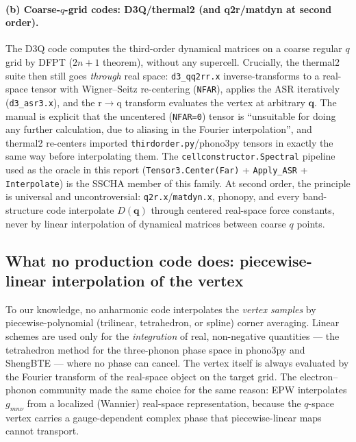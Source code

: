 \documentclass[11pt,a4paper]{article}
\newcommand{\qv}{\mathbf{q}}
\begin{document}
\paragraph{(b) Coarse-$q$-grid codes: D3Q/thermal2 (and
q2r/matdyn at second order).}  The D3Q code \cite{d3q} computes the
third-order dynamical matrices on a coarse regular $q$ grid by DFPT
($2n{+}1$ theorem), without any supercell.  Crucially, the thermal2 suite
\cite{thermal2} then still goes \emph{through} real space:
\texttt{d3\_qq2rr.x} inverse-transforms to a real-space tensor with
Wigner--Seitz re-centering (\texttt{NFAR}), applies the ASR iteratively
(\texttt{d3\_asr3.x}), and the r$\to$q transform evaluates the vertex at
arbitrary $\qv$.  The manual is explicit that the uncentered
(\texttt{NFAR=0}) tensor is ``unsuitable for doing any further
calculation, due to aliasing in the Fourier interpolation'', and thermal2
re-centers imported \texttt{thirdorder.py}/phono3py tensors in exactly
the same way before interpolating them.  The
\texttt{cellconstructor.Spectral} pipeline used as the oracle in this
report (\texttt{Tensor3.Center(Far)} + \texttt{Apply\_ASR} +
\texttt{Interpolate}) is the SSCHA member of this family.  At second
order, the principle is universal and uncontroversial:
\texttt{q2r.x}/\texttt{matdyn.x}, phonopy, and every band-structure code
interpolate $D(\qv)$ through centered real-space force constants, never
by linear interpolation of dynamical matrices between coarse $q$ points.

\subsection{What no production code does: piecewise-linear interpolation
of the vertex}
\label{sec:codes-trilinear}

To our knowledge, no anharmonic code interpolates the \emph{vertex
samples} by piecewise-polynomial (trilinear, tetrahedron, or spline)
corner averaging.  Linear schemes are used only for the
\emph{integration} of real, non-negative quantities --- the tetrahedron
method for the three-phonon phase space in phono3py and ShengBTE
\cite{phono3py,shengbte} --- where no phase can cancel.  The vertex
itself is always evaluated by the Fourier transform of the real-space
object on the target grid.  The electron--phonon community made the same
choice for the same reason: EPW \cite{epw} interpolates $g_{mn\nu}$ from
a localized (Wannier) real-space representation, because the $q$-space
vertex carries a gauge-dependent complex phase that piecewise-linear
maps cannot transport.
\end{document}
